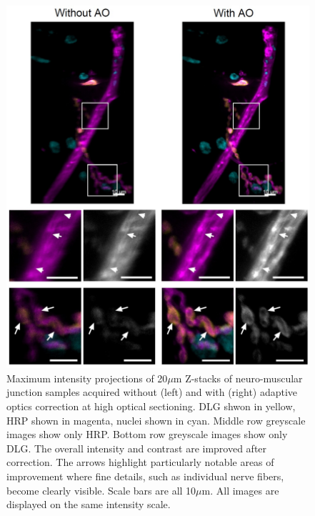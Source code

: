 \begin{figure}[h]
	\centering
	\includegraphics[width=\textwidth]{images/Aurox_NMJ_composite_grey_and_color.jpg}
	\caption{Maximum intensity projections of 20$\mu$m Z-stacks of 
		neuro-muscular junction samples acquired without (left) and with 
		(right) adaptive optics correction at high optical sectioning. 
		DLG shwon in yellow, HRP shown in magenta, nuclei shown in cyan. 
		Middle row greyscale images show only HRP. Bottom row greyscale 
		images show only DLG. The overall intensity and contrast are 
		improved after correction. The arrows highlight particularly 
		notable areas of improvement where fine details, such as 
		individual nerve fibers, become clearly visible. Scale bars are 
		all 10$\mu$m. All images are displayed on the same intensity 
		scale.}
	\label{fig:Aurox_NMJ_composite_grey_and_color}
\end{figure}
